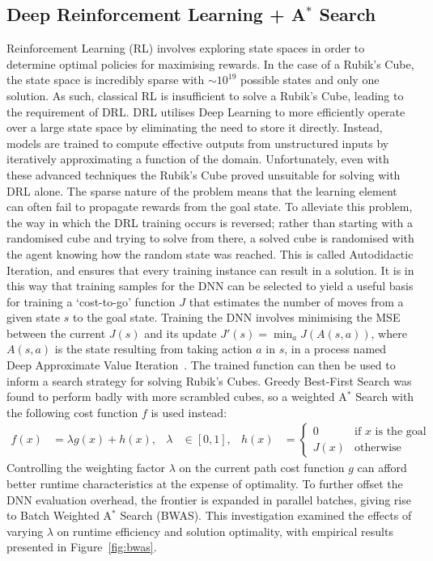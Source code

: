 \documentclass[UKenglish]{svproc}
\begin{document}
\subsection{Deep Reinforcement Learning + A$^{\ast}$ Search}
Reinforcement Learning (RL) involves exploring state spaces in order to determine optimal policies for maximising rewards. In the case of a Rubik's Cube, the state space is incredibly sparse with $\sim 10^{19}$ possible states and only one solution. As such, classical RL is insufficient to solve a Rubik's Cube, leading to the requirement of DRL. DRL utilises Deep Learning to more efficiently operate over a large state space by eliminating the need to store it directly. Instead, models are trained to compute effective outputs from unstructured inputs by iteratively approximating a function of the domain.
Unfortunately, even with these advanced techniques the Rubik's Cube proved unsuitable for solving with DRL alone. The sparse nature of the problem means that the learning element can often fail to propagate rewards from the goal state. To alleviate this problem, the way in which the DRL training occurs is reversed; rather than starting with a randomised cube and trying to solve from there, a solved cube is randomised with the agent knowing how the random state was reached. This is called Autodidactic Iteration, and ensures that every training instance can result in a solution. It is in this way that training samples for the DNN can be selected to yield a useful basis for training a `cost-to-go' function $J$ that estimates the number of moves from a given state $s$ to the goal state. Training the DNN involves minimising the MSE between the current $J(s)$ and its update $J'(s)=\min_aJ(A(s,a))$, where $A(s,a)$ is the state resulting from taking action $a$ in $s$, in a process named Deep Approximate Value Iteration~\autocite{agostinelli2019solving}.
The trained function can then be used to inform a search strategy for solving Rubik's Cubes. Greedy Best-First Search was found to perform badly with more scrambled cubes, so a weighted A$^\ast$ Search with the following cost function $f$ is used instead:
\begin{align*}
  f(x) &= \lambda g(x) + h(x), & \lambda &\in [0,1], & h(x) &=
  \begin{cases}
    0    & \text{if $x$ is the goal node} \\
    J(x) & \text{otherwise}
  \end{cases}
\end{align*}
Controlling the weighting factor $\lambda$ on the current path cost function $g$ can afford better runtime characteristics at the expense of optimality. To further offset the DNN evaluation overhead, the frontier is expanded in parallel batches, giving rise to Batch Weighted A$^\ast$ Search (BWAS). This investigation examined the effects of varying $\lambda$ on runtime efficiency and solution optimality, with empirical results presented in Figure~\ref{fig:bwas}.
\end{document}

